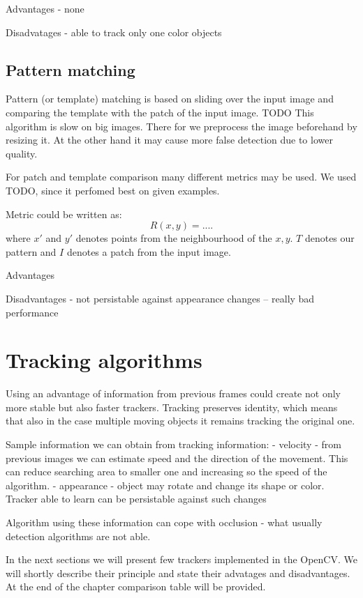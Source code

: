 
Advantages
- none

Disadvatages
- able to track only one color objects

\subsection {Pattern matching}

Pattern (or template) matching is based on sliding over the input image and comparing the template with the patch of the input image. TODO This algorithm is slow on big images. There for we preprocess the image beforehand by resizing it. At the other hand it may cause more false detection due to lower quality.

For patch and template comparison many different metrics may be used. We used TODO, since it perfomed best on given examples.

Metric could be written as:
$$R(x, y) = ....$$
where $x'$ and $y'$ denotes points from the neighbourhood of the $x, y$. $T$ denotes our pattern and $I$ denotes a patch from the input image. 

Advantages

Disadvantages
- not persistable against appearance changes -- really bad performance


\section{Tracking algorithms}

Using an advantage of information from previous frames could create not only
more stable but also faster trackers. Tracking preserves identity, which means
that also in the case multiple moving objects it remains tracking the original
one.

Sample information we can obtain from tracking information:
- velocity - from previous images we can estimate speed and the direction of
  the movement. This can reduce searching area to smaller one and increasing so
  the speed of the algorithm.
- appearance - object may rotate and change its shape or color. Tracker able to
  learn can be persistable against such changes

Algorithm using these information can cope with occlusion - what usually
detection algorithms are not able.

In the next sections we will present few trackers implemented in the OpenCV. We
will shortly describe their principle and state their advatages and
disadvantages. At the end of the chapter comparison table will be provided.

